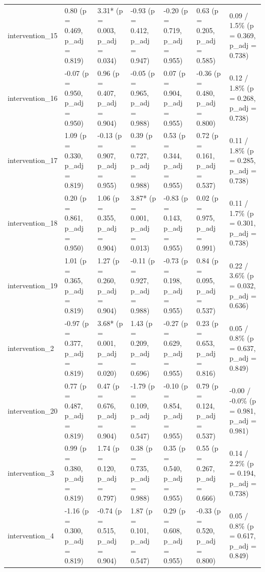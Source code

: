 \documentclass[
  letterpaper,
  DIV=11,
  numbers=noendperiod]{scrartcl}
\begin{document}
\begin{longtable}{l|llllll}
intervention\_15 & {0.80 (p = 0.469, p\_adj = 0.819)} & {3.31* (p = 0.003, p\_adj = 0.034)} & {-0.93 (p = 0.412, p\_adj = 0.947)} & {-0.20 (p = 0.719, p\_adj = 0.955)} & {0.63 (p = 0.205, p\_adj = 0.585)} & {0.09 / 1.5\% (p = 0.369, p\_adj = 0.738)} \\ 
intervention\_16 & {-0.07 (p = 0.950, p\_adj = 0.950)} & {0.96 (p = 0.407, p\_adj = 0.904)} & {-0.05 (p = 0.965, p\_adj = 0.988)} & {0.07 (p = 0.904, p\_adj = 0.955)} & {-0.36 (p = 0.480, p\_adj = 0.800)} & {0.12 / 1.8\% (p = 0.268, p\_adj = 0.738)} \\ 
intervention\_17 & {1.09 (p = 0.330, p\_adj = 0.819)} & {-0.13 (p = 0.907, p\_adj = 0.955)} & {0.39 (p = 0.727, p\_adj = 0.988)} & {0.53 (p = 0.344, p\_adj = 0.955)} & {0.72 (p = 0.161, p\_adj = 0.537)} & {0.11 / 1.8\% (p = 0.285, p\_adj = 0.738)} \\ 
intervention\_18 & {0.20 (p = 0.861, p\_adj = 0.950)} & {1.06 (p = 0.355, p\_adj = 0.904)} & {3.87* (p = 0.001, p\_adj = 0.013)} & {-0.83 (p = 0.143, p\_adj = 0.955)} & {0.02 (p = 0.975, p\_adj = 0.991)} & {0.11 / 1.7\% (p = 0.301, p\_adj = 0.738)} \\ 
intervention\_19 & {1.01 (p = 0.365, p\_adj = 0.819)} & {1.27 (p = 0.260, p\_adj = 0.904)} & {-0.11 (p = 0.927, p\_adj = 0.988)} & {-0.73 (p = 0.198, p\_adj = 0.955)} & {0.84 (p = 0.095, p\_adj = 0.537)} & {0.22 / 3.6\% (p = 0.032, p\_adj = 0.636)} \\ 
intervention\_2 & {-0.97 (p = 0.377, p\_adj = 0.819)} & {3.68* (p = 0.001, p\_adj = 0.020)} & {1.43 (p = 0.209, p\_adj = 0.696)} & {-0.27 (p = 0.629, p\_adj = 0.955)} & {0.23 (p = 0.653, p\_adj = 0.816)} & {0.05 / 0.8\% (p = 0.637, p\_adj = 0.849)} \\ 
intervention\_20 & {0.77 (p = 0.487, p\_adj = 0.819)} & {0.47 (p = 0.676, p\_adj = 0.904)} & {-1.79 (p = 0.109, p\_adj = 0.547)} & {-0.10 (p = 0.854, p\_adj = 0.955)} & {0.79 (p = 0.124, p\_adj = 0.537)} & {-0.00 / -0.0\% (p = 0.981, p\_adj = 0.981)} \\ 
intervention\_3 & {0.99 (p = 0.380, p\_adj = 0.819)} & {1.74 (p = 0.120, p\_adj = 0.797)} & {0.38 (p = 0.735, p\_adj = 0.988)} & {0.35 (p = 0.540, p\_adj = 0.955)} & {0.55 (p = 0.267, p\_adj = 0.666)} & {0.14 / 2.2\% (p = 0.194, p\_adj = 0.738)} \\ 
intervention\_4 & {-1.16 (p = 0.300, p\_adj = 0.819)} & {-0.74 (p = 0.515, p\_adj = 0.904)} & {1.87 (p = 0.101, p\_adj = 0.547)} & {0.29 (p = 0.608, p\_adj = 0.955)} & {-0.33 (p = 0.520, p\_adj = 0.800)} & {0.05 / 0.8\% (p = 0.617, p\_adj = 0.849)} \\ 

\end{longtable}
\end{document}
